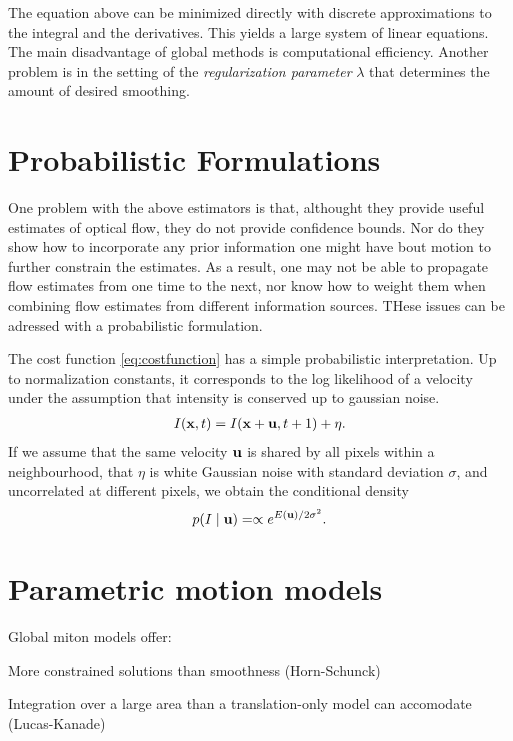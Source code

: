\begin{compactdesc}
The equation above can be minimized directly with discrete approximations to the integral and the derivatives. This yields a large system of linear equations. The main disadvantage of global methods is computational efficiency. Another problem is in the setting of the \emph{regularization parameter} $\lambda$ that determines the amount of desired smoothing.
\section{Probabilistic Formulations}
One problem with the above estimators is that, althought they provide useful estimates of optical flow, they do not provide confidence bounds. Nor do they show how to incorporate any prior information one might have bout motion to further constrain the estimates. As a result, one may not be able to propagate flow estimates from one time to the next, nor know how to weight them when combining flow estimates from different information sources. THese issues can be adressed with a probabilistic formulation.

The cost function \ref{eq:costfunction} has a simple probabilistic interpretation. Up to normalization constants, it corresponds to the log likelihood of a velocity under the assumption that intensity is conserved up to gaussian noise. 
\begin{gather*}
	I(\bm{\mathrm{x}},t)=I(\bm{\mathrm{x}}+\bm{\mathrm{u}},t+1)+\eta.
\end{gather*}
If we assume that the same velocity $\bm{\mathrm{u}}$ is shared by all pixels within a neighbourhood, that $\eta$ is white Gaussian noise with standard deviation $\sigma$, and uncorrelated at different pixels, we obtain the conditional density
\begin{gather*}
	p(I\mid \bm{\mathrm{u}})=\propto e^{E(\bm{\mathrm{u}})/2\sigma^2}.
\end{gather*}
\section{Parametric motion models}
Global miton models offer:\\
\begin{enumerate*}[label=\protect\circled{\arabic*},itemjoin=]
	\item More constrained solutions than smoothness (Horn-Schunck)\\
	\item Integration over a large area than a translation-only model can accomodate (Lucas-Kanade)
\end{enumerate*}
\end{compactdesc}
